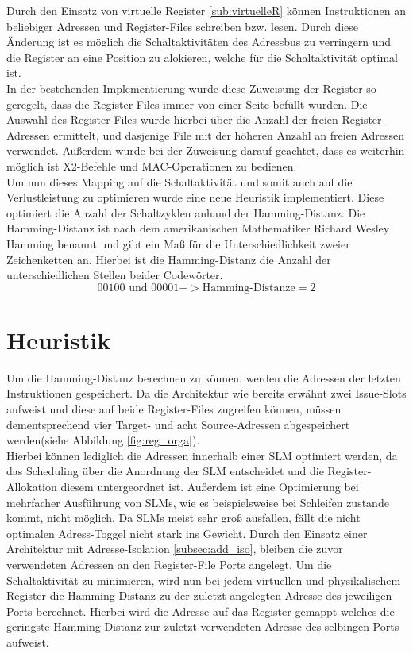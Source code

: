 Durch den Einsatz von virtuelle Register \ref{sub:virtuelleR} können Instruktionen an beliebiger Adressen und Register-Files schreiben bzw. lesen. Durch diese Änderung ist es möglich die Schaltaktivitäten des Adressbus zu verringern und die Register an eine Position zu alokieren, welche für die Schaltaktivität optimal ist.\\
In der bestehenden Implementierung wurde diese Zuweisung der Register so geregelt, dass die Register-Files immer von einer Seite befüllt wurden. Die Auswahl des Register-Files wurde hierbei über die Anzahl der freien Register-Adressen ermittelt, und dasjenige File mit der höheren Anzahl an freien Adressen verwendet. Außerdem wurde bei der Zuweisung darauf geachtet, dass es weiterhin möglich ist X2-Befehle und MAC-Operationen zu bedienen.\\
Um nun dieses Mapping auf die Schaltaktivität und somit auch auf die Verlustleistung zu optimieren wurde eine neue Heuristik implementiert.
Diese optimiert die Anzahl der Schaltzyklen anhand der Hamming-Distanz.
Die Hamming-Distanz ist nach dem amerikanischen Mathematiker Richard Wesley Hamming benannt und gibt ein Maß für die Unterschiedlichkeit zweier Zeichenketten an. Hierbei ist die Hamming-Distanz die Anzahl der unterschiedlichen Stellen beider Codewörter.
\begin{equation}
00100 \text{ und } 00001 -> \text{Hamming-Distanze}= 2
\label{eq:hammingdistanze}
\end{equation}
 
\section{Heuristik}
\label{sec:Heuristik}
Um die Hamming-Distanz berechnen zu können, werden die Adressen der letzten Instruktionen gespeichert. Da die Architektur wie bereits erwähnt zwei Issue-Slots aufweist und diese auf beide Register-Files zugreifen können, müssen dementsprechend vier Target- und acht Source-Adressen abgespeichert werden(siehe Abbildung \ref{fig:reg_orga}).\\
Hierbei können lediglich die Adressen innerhalb einer SLM optimiert werden, da das Scheduling über die Anordnung der SLM entscheidet und die Register-Allokation diesem untergeordnet ist. Außerdem ist eine Optimierung bei mehrfacher Ausführung von SLMs, wie es beispielsweise bei Schleifen zustande kommt, nicht möglich. Da SLMs meist sehr groß ausfallen, fällt die nicht optimalen Adress-Toggel nicht stark ins Gewicht. 
Durch den Einsatz einer Architektur mit Adresse-Isolation \ref{subsec:add_iso}, bleiben die zuvor verwendeten Adressen an den Register-File Ports angelegt. Um die Schaltaktivität zu minimieren, wird nun bei jedem virtuellen und physikalischem Register die Hamming-Distanz zu der zuletzt angelegten Adresse des jeweiligen Ports berechnet. Hierbei wird die Adresse auf das Register gemappt welches die geringste Hamming-Distanz zur zuletzt verwendeten Adresse des selbingen Ports aufweist.\\

